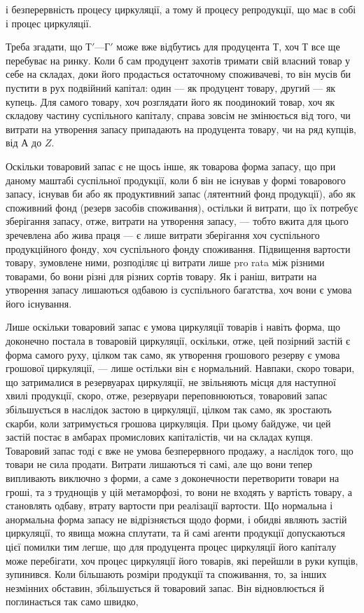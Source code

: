 \parcont{}  %
і безперервність процесу циркуляції, а тому й процесу репродукції, що
має в собі і процес циркуляції.

Треба згадати, що $Т' — Г'$ може вже відбутись для продуцента $Т$,
хоч $Т$ все ще перебуває на ринку. Коли б сам продуцент захотів тримати
свій власний товар у себе на складах, доки його продасться остаточному
споживачеві, то він мусів би пустити в рух подвійний капітал:
один — як продуцент товару, другий — як купець. Для самого товару,
хоч розглядати його як поодинокий товар, хоч як складову частину
суспільного капіталу, справа зовсім не змінюється від того, чи витрати
на утворення запасу припадають на продуцента товару, чи на ряд купців,
від $А$ до $Z$.

Оскільки товаровий запас є не щось інше, як товарова форма запасу,
що при даному маштабі суспільної продукції, коли б він не існував у
формі товарового запасу, існував би або як продуктивний запас (лятентний
фонд продукції), або як споживний фонд (резерв засобів споживання),
остільки й витрати, що їх потребує зберігання запасу, отже, витрати на
утворення запасу, — тобто вжита для цього зречевлена або жива праця —
є лише витрати зберігання хоч суспільного продукційного фонду,
хоч суспільного фонду споживання. Підвищення вартости товару,
зумовлене ними, розподіляє ці витрати лише pro rata між різними
товарами, бо вони різні для різних сортів товару. Як і раніш,
витрати на утворення запасу лишаються одбавою із суспільного багатства,
хоч вони є умова його існування.

Лише оскільки товаровий запас є умова циркуляції товарів і навіть
форма, що доконечно постала в товаровій циркуляції, оскільки, отже,
цей позірний застій є форма самого руху, цілком так само, як утворення
грошового резерву є умова грошової циркуляції, — лише остільки
він є нормальний. Навпаки, скоро товари, що затрималися в резервуарах
циркуляції, не звільняють місця для наступної хвилі продукції,
скоро, отже, резервуари переповнюються, товаровий запас збільшується
в наслідок застою в циркуляції, цілком так само, як зростають
скарби, коли затримується грошова циркуляція. При цьому
байдуже, чи цей застій постає в амбарах промислових капіталістів, чи
на складах купця. Товаровий запас тоді є вже не умова безперервного
продажу, а наслідок того, що товари не сила продати. Витрати лишаються
ті самі, але що вони тепер випливають виключно з форми, а саме з
доконечности перетворити товари на гроші, та з труднощів у цій метаморфозі,
то вони не входять у вартість товару, а становлять одбаву, втрату
вартости при реалізації вартости. Що нормальна і анормальна форма
запасу не відрізняється щодо форми, і обидві являють застій циркуляції,
то явища можна сплутати, та й самі аґенти продукції допускаються
цієї помилки тим легше, що для продуцента процес циркуляції
його капіталу може перебігати, хоч процес циркуляції його товарів,
які перейшли в руки купців, зупинився. Коли більшають розміри
продукції та споживання, то, за інших незмінних обставин, збільшується
й товаровий запас. Він відновлюється й поглинається так само швидко,
\parbreak{}  %
